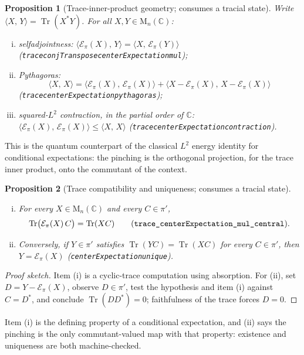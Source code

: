 \documentclass[11pt]{article}
\renewcommand{\_}{\textunderscore\allowbreak}
\newtheorem{proposition}{Proposition}
\theoremstyle{remark}
\newcommand{\C}{\mathbb C}
\newcommand{\Mn}{\mathrm{M}_n(\C)}
\newcommand{\Tr}{\operatorname{Tr}}
\newcommand{\pinch}{\mathcal E}
\newcommand{\ip}[2]{\langle #1,\,#2\rangle}
\begin{document}
\begin{proposition}[Trace-inner-product geometry; consumes a tracial state]
\label{prop:geometry}
Write $\ip{X}{Y} = \Tr(X^{*}Y)$. For all $X, Y \in \Mn$:
\begin{enumerate}[(i)]
\item selfadjointness: $\ip{\pinch_\pi(X)}{Y} = \ip{X}{\pinch_\pi(Y)}$ (\texttt{trace\_conjTranspose\_centerExpectation\_mul});
\item Pythagoras:
\[
\ip{X}{X} = \ip{\pinch_\pi(X)}{\pinch_\pi(X)} + \ip{X - \pinch_\pi(X)}{X - \pinch_\pi(X)}
\]
(\texttt{trace\_centerExpectation\_pythagoras});
\item squared-$L^2$ contraction, in the partial order of $\C$:
$\ip{\pinch_\pi(X)}{\pinch_\pi(X)} \le \ip{X}{X}$ (\texttt{trace\_centerExpectation\_contraction}).
\end{enumerate}
\end{proposition}

This is the quantum counterpart of the classical $L^2$ energy identity for conditional expectations: the pinching is the orthogonal projection, for the trace inner product, onto the commutant of the context.

\begin{proposition}[Trace compatibility and uniqueness; consumes a tracial state]
\label{prop:unique}
\begin{enumerate}[(i)]
\item For every $X \in \Mn$ and every $C \in \pi'$,
\[
\Tr\bigl(\pinch_\pi(X)\, C\bigr) = \Tr(X C)
\qquad (\texttt{trace\_centerExpectation\_mul\_central}).
\]
\item Conversely, if $Y \in \pi'$ satisfies $\Tr(YC) = \Tr(XC)$ for every $C \in \pi'$, then $Y = \pinch_\pi(X)$ (\texttt{centerExpectation\_unique}).
\end{enumerate}
\end{proposition}

\begin{proof}[Proof sketch]
Item (i) is a cyclic-trace computation using absorption. For (ii), set $D = Y - \pinch_\pi(X)$, observe $D \in \pi'$, test the hypothesis and item (i) against $C = D^{*}$, and conclude $\Tr(D D^{*}) = 0$; faithfulness of the trace forces $D = 0$.
\end{proof}

Item (i) is the defining property of a conditional expectation, and (ii) says the pinching is the only commutant-valued map with that property: existence and uniqueness are both machine-checked.
\end{document}
